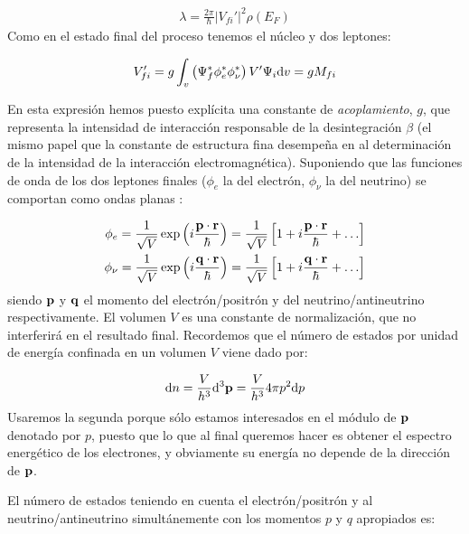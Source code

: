 \begin{eqnarray}
	\lambda = \frac{2\pi}{\hbar} |V_{fi}'|^2 \rho (E_F)
\end{eqnarray}
Como en el estado final del proceso tenemos el núcleo y dos leptones:

\begin{eqnarray}
	V_{fi}'  = g \int_v \left( \Psi_f^* \phi_e^* \phi_\nu^* \right) V' \Psi_i \mathrm{d} v = g M_{fi}
\end{eqnarray}

En esta expresión hemos puesto explícita una constante de \textit{acoplamiento}, $g$, que representa la intensidad de interacción responsable de la desintegración $\beta$ (el mismo papel que la constante de estructura fina desempeña en al determinación de la intensidad de la interacción electromagnética). Suponiendo que las funciones de onda de los dos leptones finales ($\phi_e$ la del electrón, $\phi_\nu$ la del neutrino) se comportan como ondas planas :

\begin{eqnarray}
	\phi_e = \frac{1}{\sqrt{V}} \exp \left( i \frac{\mathbf{p} \cdot \mathbf{r}}{\hbar} \right) = \frac{1}{\sqrt{V}} \left[ 1+i\frac{\mathbf{p} \cdot \mathbf{r}}{\hbar}+ \ldots \right] \label{Ec:02-02-19}  \\
	\phi_\nu = \frac{1}{\sqrt{V}} \exp  \left( i \frac{\mathbf{q} \cdot \mathbf{r}}{\hbar} \right) = \frac{1}{\sqrt{V}} \left[ 1+i\frac{\mathbf{q} \cdot \mathbf{r}}{\hbar}+ \ldots \right] \label{Ec:02-02-20}
\end{eqnarray}
siendo $\mathbf{p}$ y $\mathbf{q}$ el momento del electrón/positrón y del neutrino/antineutrino respectivamente. El volumen $V$ es una constante de normalización, que no interferirá en el resultado final. Recordemos que el número de estados por unidad de energía confinada en un volumen $V$ viene dado por:

\begin{eqnarray}
	\mathrm{d} n = \frac{V}{h^3} \mathrm{d}^3 \mathbf{p} = \frac{V}{h^3} 4 \pi p^2 \mathrm{d} p
\end{eqnarray}
Usaremos la segunda porque sólo estamos interesados en el módulo de $\mathbf{p}$ denotado por $p$, puesto que lo que al final queremos hacer es obtener el espectro energético de los electrones, y obviamente su energía no depende de la dirección de $\mathbf{p}$. 

El número de estados teniendo en cuenta el electrón/positrón y al neutrino/antineutrino simultánemente con los momentos $p$ y $q$ apropiados es:


